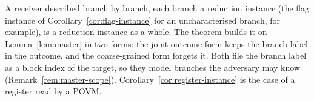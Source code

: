 
A receiver described branch by branch, each branch a reduction instance (the
flag instance of Corollary~\ref{cor:flag-instance} for an uncharacterised
branch, for example), is a reduction instance as a whole. The theorem builds
it on Lemma~\ref{lem:master} in two forms: the joint-outcome form keeps the
branch label in the outcome, and the coarse-grained form forgets it. Both
file the branch label as a block index of the target, so they model branches
the adversary may know (Remark~\ref{rem:master-scope}).
Corollary~\ref{cor:register-instance} is the case of a register read by a
POVM.


